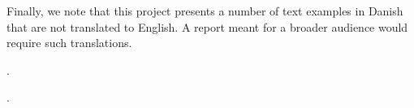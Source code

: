 \documentclass[12pt, fleqn]{report}
\begin{document}
Finally, we note that this project presents a number of text examples in Danish that are not translated to English.
A report meant for a broader audience would require such translations.

\tableofcontents

\setlength{\headheight}{15pt}
\addtolength{\topmargin}{-2.5pt}.















\renewcommand*{\bibfont}{\normalfont\footnotesize}.
\printbibliography[heading=bibintoc]

\appendix

\end{document}
